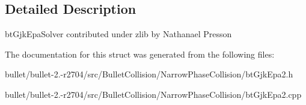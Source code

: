 \subsection{Detailed Description}
bt\+Gjk\+Epa\+Solver contributed under zlib by Nathanael Presson 

The documentation for this struct was generated from the following files\+:\begin{DoxyCompactItemize}
\item 
bullet/bullet-\/2.-\/r2704/src/\+Bullet\+Collision/\+Narrow\+Phase\+Collision/bt\+Gjk\+Epa2.\+h\item 
bullet/bullet-\/2.-\/r2704/src/\+Bullet\+Collision/\+Narrow\+Phase\+Collision/bt\+Gjk\+Epa2.\+cpp\end{DoxyCompactItemize}
